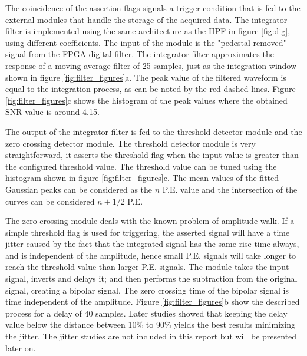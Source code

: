 The coincidence of the assertion flags signals a trigger condition that is fed to the external modules that handle the storage of the acquired data. The integrator filter is implemented using the same architecture as the HPF in figure \ref{fig:dig}, using different coefficients. The input of the module is the "pedestal removed" signal from the FPGA digital filter. The integrator filter approximates the response of a moving average filter of 25 samples, just as the integration window shown in figure \ref{fig:filter_figures}a. The peak value of the filtered waveform is equal to the integration process, as can be noted by the red dashed lines. Figure \ref{fig:filter_figures}c shows the histogram of the peak values where the obtained SNR value is around 4.15.

The output of the integrator filter is fed to the threshold detector module and the zero crossing detector module. The threshold detector module is very straightforward, it asserts the threshold flag when the input value is greater than the configured threshold value. The threshold value can be tuned using the histogram shown in figure \ref{fig:filter_figures}c. The mean values of the fitted Gaussian peaks can be considered as the $n$ P.E. value and the intersection of the curves can be considered $n + 1/2$ P.E.  

The zero crossing module deals with the known problem of amplitude walk. If a simple threshold flag is used for triggering, the asserted signal will have a time jitter caused by the fact that the integrated signal has the same rise time always, and is independent of the amplitude, hence small P.E. signals will take longer to reach the threshold value than larger P.E. signals. The module takes the input signal, inverts and delays it; and then performs the subtraction from the original signal, creating a bipolar signal. The zero crossing time of the bipolar signal is time independent of the amplitude. Figure \ref{fig:filter_figures}b show the described process for a delay of 40 samples. Later studies showed that keeping the delay value below the distance between 10\% to 90\% yields the best results minimizing the jitter. The jitter studies are not included in this report but will be presented later on. 


